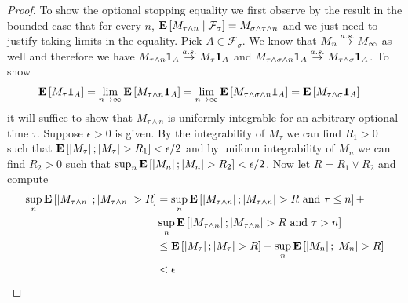 \begin{proof}
To show the optional stopping equality we first observe by the result
in the bounded case that for every $n$, $\cexpectationlong{\mathcal{F}_\sigma}{M_{\tau
    \wedge n}} = M_{\sigma
    \wedge \tau \wedge n}$ and we just need to justify taking limits
  in the equality.  Pick $A \in
  \mathcal{F}_\sigma$.  We know that $M_n \toas M_\infty$ as well and therefore 
we have $M_{\tau
  \wedge n} \characteristic{A} \toas M_\tau \characteristic{A}$ and $M_{\tau
  \wedge \sigma \wedge n} \characteristic{A} \toas M_{\tau \wedge \sigma} \characteristic{A}$.  To
show 
\begin{align*}
\expectation{M_\tau \characteristic{A}} 
&= \lim_{n\to \infty} \expectation{M_{\tau
  \wedge n} \characteristic{A}} = \lim_{n\to \infty} \expectation{M_{\tau
  \wedge \sigma \wedge n} \characteristic{A}} 
= \expectation{M_{\tau \wedge \sigma} \characteristic{A}}
\end{align*} 
it will suffice to show that $M_{\tau \wedge n}$
is uniformly integrable for an arbitrary optional time $\tau$.  Suppose $\epsilon > 0$ is given.  By the
integrability of $M_\tau$ we can find $R_1 > 0$ such that
$\expectation{\abs{M_\tau}; \abs{M_\tau} > R_1} < \epsilon/2$ and by
uniform integrability of $M_n$ we can find $R_2 > 0$ such that $\sup_n
\expectation{\abs{M_n} ; \abs{M_n} > R_2} < \epsilon/2$.  Now let $R =
R_1 \vee R_2$ and compute
\begin{align*}
\sup_n \expectation{\abs{M_{\tau \wedge n}} ; \abs{M_{\tau \wedge n}}
  > R} &= \sup_n \expectation{\abs{M_{\tau \wedge n}} ; \abs{M_{\tau \wedge n}}
  > R \text{ and } \tau \leq n} + \\
&\sup_n \expectation{\abs{M_{\tau \wedge n}} ; \abs{M_{\tau \wedge n}}
  > R \text{ and } \tau > n} \\
&\leq \expectation{\abs{M_{\tau}} ; \abs{M_{\tau}}
  > R } + \sup_n \expectation{\abs{M_{n}} ; \abs{M_{n}}
  > R } \\
&< \epsilon
\end{align*}
\end{proof}

